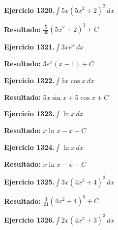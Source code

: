 \documentclass[10pt,a4paper]{article}
\begin{document}
\begin{ejbox}
\textbf{Ejercicio 1320.}\quad $\int 5x(5x^2 + 2)^{2}\,dx$
\end{ejbox}

\begin{solbox}
\textbf{Resultado:} \(\displaystyle \frac{5}{30}(5x^2+2)^{3} + C\)
\end{solbox}

\newpage
\begin{ejbox}
\textbf{Ejercicio 1321.}\quad $\int 3x e^{x}\,dx$
\end{ejbox}

\begin{solbox}
\textbf{Resultado:} \(\displaystyle 3e^x(x-1) + C\)
\end{solbox}

\begin{ejbox}
\textbf{Ejercicio 1322.}\quad $\int 5x \cos x\,dx$
\end{ejbox}

\begin{solbox}
\textbf{Resultado:} \(\displaystyle 5x\sin x + 5\cos x + C\)
\end{solbox}

\begin{ejbox}
\textbf{Ejercicio 1323.}\quad $\int \ln x\,dx$
\end{ejbox}

\begin{solbox}
\textbf{Resultado:} \(\displaystyle x\ln x - x + C\)
\end{solbox}

\newpage
\begin{ejbox}
\textbf{Ejercicio 1324.}\quad $\int \ln x\,dx$
\end{ejbox}

\begin{solbox}
\textbf{Resultado:} \(\displaystyle x\ln x - x + C\)
\end{solbox}

\begin{ejbox}
\textbf{Ejercicio 1325.}\quad $\int 3x(4x^2 + 4)^{2}\,dx$
\end{ejbox}

\begin{solbox}
\textbf{Resultado:} \(\displaystyle \frac{3}{24}(4x^2+4)^{3} + C\)
\end{solbox}

\begin{ejbox}
\textbf{Ejercicio 1326.}\quad $\int 2x(4x^2 + 3)^{3}\,dx$
\end{ejbox}
\end{document}
